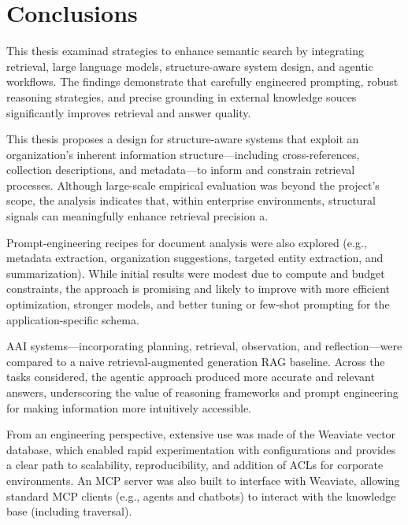 \cleardoublepage%
\label{chap:conclusion}%


\section{Conclusions}

This thesis examinad strategies to enhance semantic search by integrating retrieval, large language models, structure-aware system design, and agentic workflows. The findings demonstrate that carefully engineered prompting, robust reasoning strategies, and precise grounding in external knowledge souces significantly improves retrieval and answer quality.

This thesis proposes a design for structure-aware systems that exploit an organization's inherent information structure—including cross-references, collection descriptions, and metadata—to inform and constrain retrieval processes. Although large-scale empirical evaluation was beyond the project's scope, the analysis indicates that, within enterprise environments, structural signals can meaningfully enhance retrieval precision a.

Prompt-engineering recipes for document analysis were also explored (e.g., metadata extraction, organization suggestions, targeted entity extraction, and summarization). While initial results were modest due to compute and budget constraints, the approach is promising and likely to improve with more efficient optimization, stronger models, and better tuning or few-shot prompting for the application-specific schema.

\gls{AAI} systems—incorporating planning, retrieval, observation, and reflection—were compared to a naive retrieval-augmented generation \gls{RAG} baseline. Across the tasks considered, the agentic approach produced more accurate and relevant answers, underscoring the value of reasoning frameworks and prompt engineering for making information more intuitively accessible.

From an engineering perspective, extensive use was made of the Weaviate vector database, which enabled rapid experimentation with configurations and provides a clear path to scalability, reproducibility, and addition of \glspl{ACL} for corporate environments. An \gls{MCP} server was also built to interface with Weaviate, allowing standard \gls{MCP} clients (e.g., agents and chatbots) to interact with the knowledge base (including traversal).

